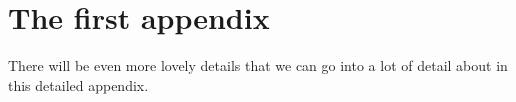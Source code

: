 



\chapter{The first appendix}\label{chapter:appendix}


There will be even more lovely details that we can go into a lot of detail about in this detailed appendix.




